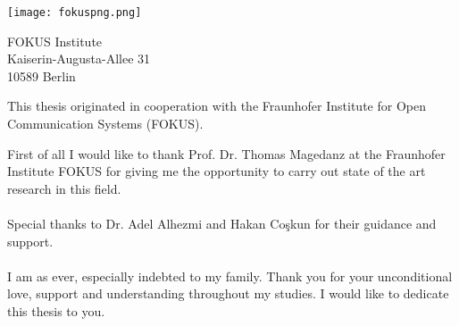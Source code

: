 \thispagestyle{empty}
\vspace*{3cm}


\begin{center}
\texttt{[image: fokuspng.png]}
\end{center}

\vspace*{0.2cm}

\begin{center}
FOKUS Institute\\
Kaiserin-Augusta-Allee 31\\
10589 Berlin\\
\end{center}
\vspace*{0.5cm}

\noindent This thesis originated in cooperation with the Fraunhofer Institute for Open Communication Systems (FOKUS).

\vspace*{1cm}
\noindent 
First of all I would like to thank Prof. Dr. Thomas Magedanz at the Fraunhofer Institute FOKUS for giving me the opportunity to carry out state of the art research in this field. 
\\
\\
Special thanks to Dr. Adel Alhezmi and Hakan Co\c{s}kun for their guidance and support.
\\
\\
I am as ever, especially indebted to my family. Thank you for your unconditional love, support and understanding throughout my studies. I would like to dedicate this thesis to you.
